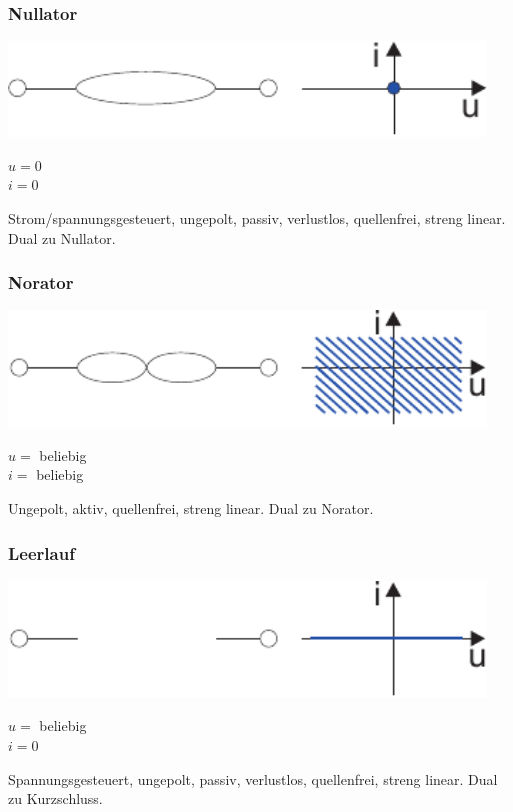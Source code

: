 \documentclass[a4paper,twocolumn,10pt]{article}
\begin{document}
\subsubsection*{Nullator}
\begin{minipage}[b]{0.26\textwidth}
\includegraphics[width=0.95\textwidth]{Grafiken/Nullator}
\end{minipage}
\hfill
\begin{minipage}[b]{0.2\textwidth}
$u=0$\\
$i=0$
\end{minipage}
Strom/spannungsgesteuert, ungepolt, passiv, verlustlos, quellenfrei, streng linear. Dual zu Nullator.

\subsubsection*{Norator}
\begin{minipage}[b]{0.26\textwidth}
\includegraphics[width=0.95\textwidth]{Grafiken/Norator}
\end{minipage}
\hfill
\begin{minipage}[b]{0.2\textwidth}
$u=$ beliebig\\
$i=$ beliebig
\end{minipage}
Ungepolt, aktiv, quellenfrei, streng linear. Dual zu Norator.

\subsubsection*{Leerlauf}
\begin{minipage}[b]{0.26\textwidth}
\includegraphics[width=0.95\textwidth]{Grafiken/Leerlauf}
\end{minipage}
\hfill
\begin{minipage}[b]{0.2\textwidth}
$u=$ beliebig\\
$i=0$
\end{minipage}
Spannungsgesteuert, ungepolt, passiv, verlustlos, quellenfrei, streng linear. Dual zu Kurzschluss.
\end{document}
